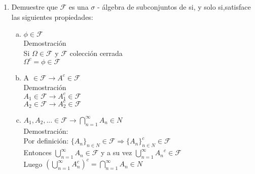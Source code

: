 \documentclass[12pt]{article}
\date{}
\begin{document}
\maketitle

\begin{enumerate}
\item  Demuestre que $\mathcal{F}$ es una $\sigma$ - álgebra de subconjuntos de si, y solo si,satisface las siguientes propiedades:
\begin{enumerate}[a)]

\item $\phi \in \mathcal{F}$\\[0.2cm]
Demostración\\[0.2cm]
Si $\Omega \in \mathcal{F}$ y $ \mathcal{F}$ colección cerrada\\[0.2cm]
$\Omega^c = \phi\in\mathcal{F}$\\[0.2cm]

\item A $\in \mathcal{F}\longrightarrow A^{c} \in\mathcal{F}$\\[0.2cm]
Demostración\\[0.2cm]
$A_1\in \mathcal{F} \longrightarrow {A_1^c} \in \mathcal{F} $\\[0.2cm]
$A_2\in \mathcal{F} \longrightarrow {A_2^c} \in \mathcal{F} $\\[0.2cm]


\item $A_1,A_2,... \in \mathcal{F} \longrightarrow\displaystyle\bigcap_{n=1}^{\infty}{A_n \in N}$\\[0.2cm]
Demostración:\\[0.2cm]
Por definición: $\{A_n\}_{n \in N} \in \mathcal{F} \Rightarrow \{A_n\}^c_{n \in N}\in \mathcal{F}$\\[0.2cm]
Entonces $\displaystyle\bigcup_{n=1}^{\infty}{A_n}\in \mathcal{F}$ y a su vez $\displaystyle\bigcup_{n=1}^{\infty}{A_n}^c\in \mathcal{F}$\\[0.2cm]
Luego $\left(\displaystyle\bigcup_{n=1}^{\infty}{A_n^c}\right)^c = \displaystyle\bigcap_{n=1}^{\infty}{A_n \in N}$

\end{enumerate}


\end{enumerate}
\end{document}
